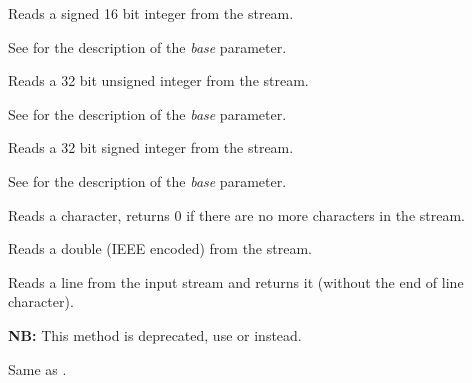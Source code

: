 
Reads a signed 16 bit integer from the stream.

See  for the
description of the {\it base} parameter.

\label{wxtextinputstreamread32}


Reads a 32 bit unsigned integer from the stream.

See  for the
description of the {\it base} parameter.

\label{wxtextinputstreamread32s}


Reads a 32 bit signed integer from the stream.

See  for the
description of the {\it base} parameter.

\label{wxtextinputstreamgetchar}


Reads a character, returns $0$ if there are no more characters in the stream.

\label{wxtextinputstreamreaddouble}


Reads a double (IEEE encoded) from the stream.

\label{wxtextinputstreamreadline}


Reads a line from the input stream and returns it (without the end of line
character).

\label{wxtextinputstreamreadstring}


{\bf NB:} This method is deprecated, use  
or  instead.

Same as .

